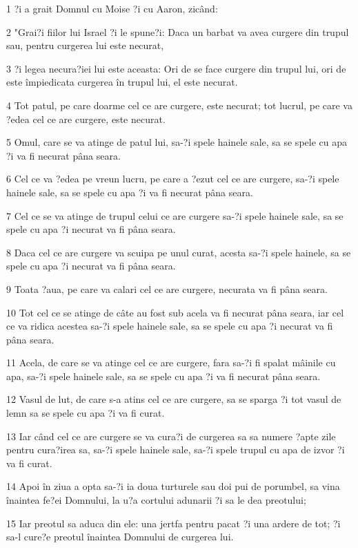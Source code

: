 \par 1 ?i a grait Domnul cu Moise ?i cu Aaron, zicând:
\par 2 "Grai?i fiilor lui Israel ?i le spune?i: Daca un barbat va avea curgere din trupul sau, pentru curgerea lui este necurat,
\par 3 ?i legea necura?iei lui este aceasta: Ori de se face curgere din trupul lui, ori de este împiedicata curgerea în trupul lui, el este necurat.
\par 4 Tot patul, pe care doarme cel ce are curgere, este necurat; tot lucrul, pe care va ?edea cel ce are curgere, este necurat.
\par 5 Omul, care se va atinge de patul lui, sa-?i spele hainele sale, sa se spele cu apa ?i va fi necurat pâna seara.
\par 6 Cel ce va ?edea pe vreun lucru, pe care a ?ezut cel ce are curgere, sa-?i spele hainele sale, sa se spele cu apa ?i va fi necurat pâna seara.
\par 7 Cel ce se va atinge de trupul celui ce are curgere sa-?i spele hainele sale, sa se spele cu apa ?i necurat va fi pâna seara.
\par 8 Daca cel ce are curgere va scuipa pe unul curat, acesta sa-?i spele hainele, sa se spele cu apa ?i necurat va fi pâna seara.
\par 9 Toata ?aua, pe care va calari cel ce are curgere, necurata va fi pâna seara.
\par 10 Tot cel ce se atinge de câte au fost sub acela va fi necurat pâna seara, iar cel ce va ridica acestea sa-?i spele hainele sale, sa se spele cu apa ?i necurat va fi pâna seara.
\par 11 Acela, de care se va atinge cel ce are curgere, fara sa-?i fi spalat mâinile cu apa, sa-?i spele hainele sale, sa se spele cu apa ?i va fi necurat pâna seara.
\par 12 Vasul de lut, de care s-a atins cel ce are curgere, sa se sparga ?i tot vasul de lemn sa se spele cu apa ?i va fi curat.
\par 13 Iar când cel ce are curgere se va cura?i de curgerea sa sa numere ?apte zile pentru cura?irea sa, sa-?i spele hainele sale, sa-?i spele trupul cu apa de izvor ?i va fi curat.
\par 14 Apoi în ziua a opta sa-?i ia doua turturele sau doi pui de porumbel, sa vina înaintea fe?ei Domnului, la u?a cortului adunarii ?i sa le dea preotului;
\par 15 Iar preotul sa aduca din ele: una jertfa pentru pacat ?i una ardere de tot; ?i sa-l cure?e preotul înaintea Domnului de curgerea lui.
